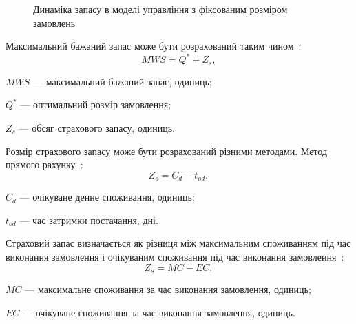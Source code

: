 \begin{figure}[H]
  \centering
{}
  \captionsetup{justification=centering}
  \caption{Динаміка запасу в моделі управління з фіксованим розміром замовлень}
  \label{fig:model_fs:dynamic}
\end{figure}

Максимальний бажаний запас може бути розрахований таким чином~\cite{Sterligova2008}:
\begin{equation} \label{eq:model_fs:mws}
MWS=Q^*+Z_s
,
\end{equation}
\begin{description}
	\item[де] $MWS$ --- максимальний бажаний запас, одиниць;
	\item $Q^*$ --- оптимальний розмір замовлення;
	\item $Z_s$ --- обсяг страхового запасу, одиниць.
\end{description}

Розмір страхового запасу може бути розрахований різними методами.
Метод прямого рахунку~\cite{Sterligova2008}:
\begin{equation} \label{eq:model_fs:zs1}
Z_s=C_d-t_{od}
,
\end{equation}
\begin{description}
	\item[де] $C_d$ --- очікуване денне споживання, одиниць;
	\item $t_{od}$ --- час затримки постачання, дні.
\end{description}

Страховий запас визначається як різниця між максимальним споживанням під час виконання замовлення і очікуваним споживання під час виконання замовлення~\cite{Sterligova2008}:
\begin{equation} \label{eq:model_fs:zs2}
Z_s=MC-EC
,
\end{equation}
\begin{description}
	\item[де] $MC$ --- максимальне споживання за час виконання замовлення, одиниць;
	\item $EC$ --- очікуване споживання за час виконання замовлення, одиниць.
\end{description}

